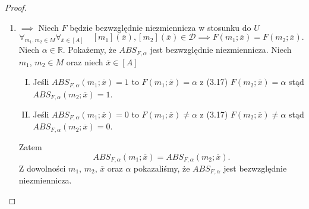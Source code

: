 \documentclass[12pt,a4paper]{report}
\newcommand{\domkniecie}[1]{\left\lbrack{#1}\right\rbrack}
\begin{document}
\begin{proof}
\begin{enumerate}
\item
$\implies$
Niech $F$ będzie bezwzględnie niezmiennicza w stosunku do $U$ 
\begin{equation}
\forall_{m_{1}, m_{2} \in M}  \forall_{\overline{x} \in \domkniecie{A}} \quad \domkniecie{m_1}(\overline{x}), \domkniecie{m_2}(\overline{x})\in \mathcal{D} \implies F(m_{1};\overline{x})=F(m_{2};\overline{x}).
\end{equation}
Niech $\alpha \in \mathbb{R}$. Pokażemy, że $ABS_{F,\alpha}$ jest bezwzględnie niezmiennicza. Niech $m_1$, $m_2 \in M$ oraz niech $\overline{x} \in \domkniecie{A}$ 
\begin{enumerate}[I.]
\item
Jeśli $ABS_{F,\alpha}(m_1;\overline{x})=1$ to $F(m_1;\overline{x})=\alpha$ z (3.17) $F(m_2;\overline{x})=\alpha$ stąd $ABS_{F,\alpha}(m_2;\overline{x})=1$.
\item
Jeśli $ABS_{F,\alpha}(m_1;\overline{x})=0$ to $F(m_1;\overline{x})\ne \alpha$ z (3.17) $F(m_2;\overline{x})\ne\alpha$ stąd $ABS_{F,\alpha}(m_2;\overline{x})=0$.
\end{enumerate}
Zatem 
$$
ABS_{F,\alpha}(m_1;\overline{x})=ABS_{F,\alpha}(m_2;\overline{x}).
$$
Z dowolności $m_1$, $m_2$, $\overline{x}$ oraz $\alpha$ pokazaliśmy, że $ABS_{F,\alpha}$ jest bezwzględnie niezmiennicza.


\end{enumerate}
\end{proof}
\end{document}
